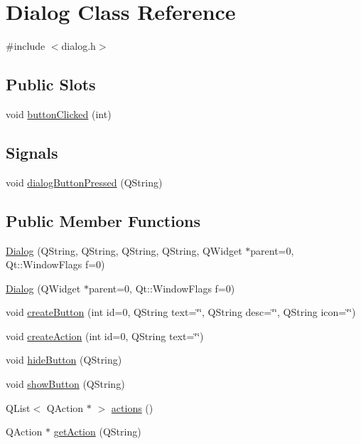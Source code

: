 \hypertarget{classDialog}{
\section{Dialog Class Reference}
\label{classDialog}
}


{\ttfamily \#include $<$dialog.h$>$}

\subsection*{Public Slots}
\begin{DoxyCompactItemize}
\item 
void \hyperlink{classDialog_a6fa11449e967bd9aba0e6afe89a5ad1a}{buttonClicked} (int)
\end{DoxyCompactItemize}
\subsection*{Signals}
\begin{DoxyCompactItemize}
\item 
void \hyperlink{classDialog_a0e8bd522a50e34e2edee2c6f64cf0399}{dialogButtonPressed} (QString)
\end{DoxyCompactItemize}
\subsection*{Public Member Functions}
\begin{DoxyCompactItemize}
\item 
\hyperlink{classDialog_a762d6d1bbcb935f48ce8a5debf7ce56e}{Dialog} (QString, QString, QString, QString, QWidget $\ast$parent=0, Qt::WindowFlags f=0)
\item 
\hyperlink{classDialog_a34b8d24a06d2d7cc90b2899b9acddd07}{Dialog} (QWidget $\ast$parent=0, Qt::WindowFlags f=0)
\item 
void \hyperlink{classDialog_afdfc6edcd72cc3f41e7ca5f4fc2499e5}{createButton} (int id=0, QString text=\char`\"{}\char`\"{}, QString desc=\char`\"{}\char`\"{}, QString icon=\char`\"{}\char`\"{})
\item 
void \hyperlink{classDialog_aebe85fc2c90f9418802687d1e0658548}{createAction} (int id=0, QString text=\char`\"{}\char`\"{})
\item 
void \hyperlink{classDialog_aa5d0ff2444e0d905bba16b0d82687f7b}{hideButton} (QString)
\item 
void \hyperlink{classDialog_aebbcfbdeabec1995374e3c37b248254f}{showButton} (QString)
\item 
QList$<$ QAction $\ast$ $>$ \hyperlink{classDialog_a583d6db9f52b55c8dae6bce5c85bfb14}{actions} ()
\item 
QAction $\ast$ \hyperlink{classDialog_a398e67a3c6eee5bbb9ed97d092211c62}{getAction} (QString)
\end{DoxyCompactItemize}
